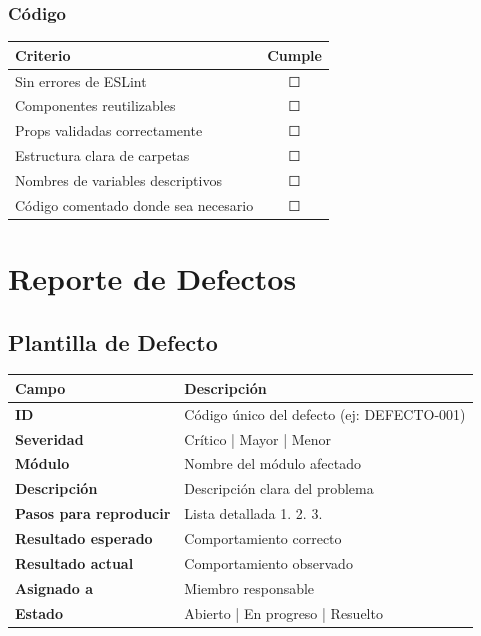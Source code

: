 \documentclass[12pt,a4paper]{report}
\begin{document}
\subsubsection{Código}
\begin{table}[h]
    \centering
    \begin{tabular}{|l|c|}
        \hline
        \textbf{Criterio} & \textbf{Cumple} \\
        \hline
        Sin errores de ESLint & ☐ \\
        \hline
        Componentes reutilizables & ☐ \\
        \hline
        Props validadas correctamente & ☐ \\
        \hline
        Estructura clara de carpetas & ☐ \\
        \hline
        Nombres de variables descriptivos & ☐ \\
        \hline
        Código comentado donde sea necesario & ☐ \\
        \hline
    \end{tabular}
\end{table}

\section{Reporte de Defectos}

\subsection{Plantilla de Defecto}

\begin{table}[h]
    \centering
    \begin{tabular}{|p{3cm}|p{10cm}|}
        \hline
        \textbf{Campo} & \textbf{Descripción} \\
        \hline
        \textbf{ID} & Código único del defecto (ej: DEFECTO-001) \\
        \hline
        \textbf{Severidad} & Crítico | Mayor | Menor \\
        \hline
        \textbf{Módulo} & Nombre del módulo afectado \\
        \hline
        \textbf{Descripción} & Descripción clara del problema \\
        \hline
        \textbf{Pasos para reproducir} & Lista detallada 1. 2. 3. \\
        \hline
        \textbf{Resultado esperado} & Comportamiento correcto \\
        \hline
        \textbf{Resultado actual} & Comportamiento observado \\
        \hline
        \textbf{Asignado a} & Miembro responsable \\
        \hline
        \textbf{Estado} & Abierto | En progreso | Resuelto \\
        \hline
    \end{tabular}
\end{table}
\end{document}
